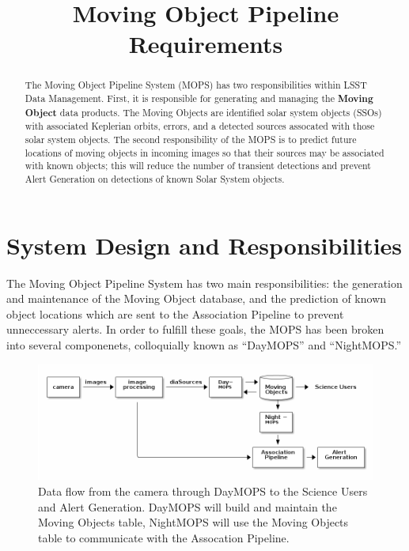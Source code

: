\documentclass[12pt,preprint]{aastex}
\begin{document}
\title{Moving Object Pipeline Requirements}

\author{}

\begin{abstract}

The Moving Object Pipeline System (MOPS) has two responsibilities
within LSST Data Management.  First, it is responsible for generating
and managing the \textbf{Moving Object} data products.  The Moving
Objects are identified solar system objects (SSOs) with associated
Keplerian orbits, errors, and a detected sources assocated with those
solar system objects.  The second responsibility of the MOPS is to
predict future locations of moving objects in incoming images so that
their sources may be associated with known objects; this will reduce
the number of transient detections and prevent Alert Generation on
detections of known Solar System objects.

\end{abstract}

\tableofcontents


\section{System Design and Responsibilities}

The Moving Object Pipeline System has two main responsibilities: the
generation and maintenance of the Moving Object database, and the
prediction of known object locations which are sent to the Association
Pipeline to prevent unneccessary alerts.  In order to fulfill these
goals, the MOPS has been broken into several componenets, colloquially
known as ``DayMOPS'' and ``NightMOPS.''
 

\begin{figure}[!ht]
\begin{center}
  \includegraphics[width=13cm]{illustrations/mopsWithinLsst.png}
\end{center}
\caption{ Data flow from the camera through DayMOPS to the Science
  Users and Alert Generation.  DayMOPS will build and maintain the
  Moving Objects table, NightMOPS will use the Moving Objects table to
  communicate with the Assocation Pipeline.  }
\label{mopsWithinLsst}
\end{figure}
\end{document}
